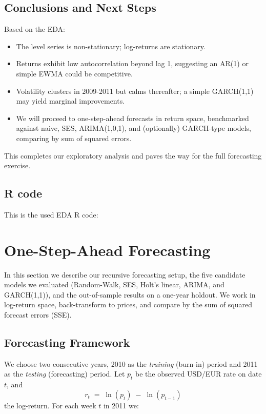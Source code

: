 \documentclass[11pt,a4paper]{article}
\begin{document}
    \subsection{Conclusions and Next Steps}
    Based on the EDA:
    \begin{itemize}
    \item The level series is non-stationary; log-returns are stationary.
    \item Returns exhibit low autocorrelation beyond lag 1, suggesting an AR(1) or simple EWMA could be competitive.
    \item Volatility clusters in 2009-2011 but calms thereafter; a simple GARCH(1,1) may yield marginal improvements.
    \item We will proceed to one-step-ahead forecasts in return space, benchmarked against naive, SES, ARIMA(1,0,1), and (optionally) GARCH‐type models, comparing by sum of squared errors.
    \end{itemize}

    This completes our exploratory analysis and paves the way for the full forecasting exercise.  

    \subsection{R code}
    This is the used EDA R code:
    

    \section{One-Step-Ahead Forecasting}
    \label{sec:forecasting}

    In this section we describe our recursive forecasting setup, the five candidate models we evaluated (Random-Walk, SES, Holt's linear, ARIMA, and GARCH(1,1)), and the out-of-sample results on a one-year holdout.  We work in log-return space, back-transform to prices, and compare by the sum of squared forecast errors (SSE).

    \subsection{Forecasting Framework}
    We choose two consecutive years, 2010 as the \emph{training} (burn-in) period and 2011 as the \emph{testing} (forecasting) period.  Let \(p_t\) be the observed USD/EUR rate on date \(t\), and
    \[
    r_t \;=\;\ln(p_t)\;-\;\ln(p_{t-1})
    \]
    the log-return.  For each week \(t\) in 2011 we:
\end{document}
